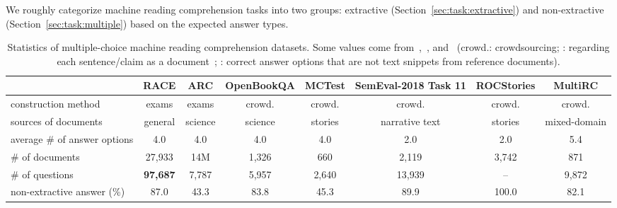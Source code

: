 \documentclass[11pt,a4paper]{article}
\begin{document}
\label{sec:mrc}

We roughly categorize machine reading comprehension tasks into two groups: extractive (Section~\ref{sec:task:extractive}) and non-extractive (Section~\ref{sec:task:multiple}) based on the expected answer types. 


\begin{table*}[htbp!]
\centering
\scriptsize
\begin{tabular}{lccccccc}
\toprule
&\textbf{RACE}   &\textbf{ARC}  &\textbf{OpenBookQA}    &\textbf{MCTest}  &\textbf{SemEval-2018 Task 11} &\textbf{ROCStories} &\textbf{MultiRC}\\
\midrule            
construction method    & exams   & exams      & crowd.     & crowd.    & crowd.    & crowd.  & crowd.            \\
sources of documents   & general & science    & science   &  stories  & narrative text   & stories & mixed-domain    \\
average \# of answer options & 4.0  & 4.0     & 4.0       & 4.0       & 2.0       & 2.0    & 5.4             \\
\# of documents     &  27,933    & 14M & 1,326    & 660       &  2,119   & 3,742 & 871   \\
\# of questions     &  \bf 97,687     & 7,787      & 5,957     & 2,640   &   13,939       &  --  &   9,872           \\

\midrule
non-extractive answer (\%)       & 87.0      & 43.3   & 83.8   & 45.3   &   89.9  &  100.0 & 82.1      \\
\bottomrule
\end{tabular}
\caption{Statistics of multiple-choice machine reading comprehension datasets. Some values come from~,~, and~ (crowd.: crowdsourcing; : regarding each sentence/claim as a document~\cite{clark2018think}; : correct answer options that are not text snippets from reference documents).}
\label{tab:related:answer}
\end{table*}
\end{document}
